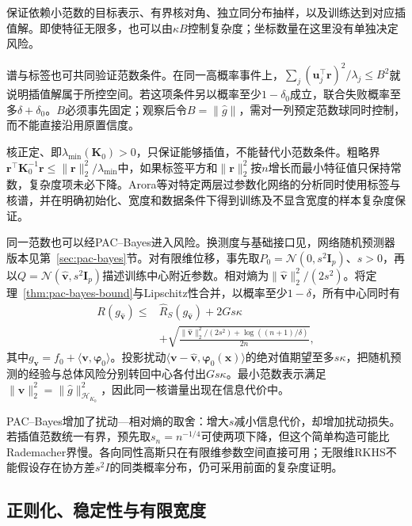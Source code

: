 保证依赖小范数的目标表示、有界核对角、独立同分布抽样，以及训练达到对应插值解。即使特征无限多，也可以由$\kappa B$控制复杂度；坐标数量在这里没有单独决定风险。

谱与标签也可共同验证范数条件。在同一高概率事件上，$\sum_j(\bm u_j^\top\bm r)^2/\lambda_j\leq B^2$就说明插值解属于所控空间。若这项条件另以概率至少$1-\delta_0$成立，联合失败概率至多$\delta+\delta_0$。$B$必须事先固定；观察后令$B=\|\widehat g\|$，需对一列预定范数球同时控制，而不能直接沿用原置信度。

核正定、即$\lambda_{\min}(\bm K_0)>0$，只保证能够插值，不能替代小范数条件。粗略界$\bm r^\top\bm K_0^{-1}\bm r\leq\|\bm r\|_2^2/\lambda_{\min}$中，如果标签平方和$\|\bm r\|_2^2$按$n$增长而最小特征值只保持常数，复杂度项未必下降。Arora等对特定两层过参数化网络的分析同时使用标签与核谱，并在明确初始化、宽度和数据条件下得到训练及不显含宽度的样本复杂度保证。

同一范数也可以经PAC--Bayes进入风险。换测度与基础接口见，网络随机预测器版本见第~\ref{sec:pac-bayes}节。对有限维位移，事先取$P_0=\mathcal N(0,s^2\bm I_p)$、$s>0$，再以$Q=\mathcal N(\widehat{\bm v},s^2\bm I_p)$描述训练中心附近参数。相对熵为$\|\widehat{\bm v}\|_2^2/(2s^2)$。将定理~\ref{thm:pac-bayes-bound}与Lipschitz性合并，以概率至少$1-\delta$，所有中心同时有
\begin{equation}
 \begin{aligned}
 R(g_{\widehat{\bm v}})\leq{}&\hat R_S(g_{\widehat{\bm v}})+2Gs\kappa\\
 &+\sqrt{\frac{\|\widehat{\bm v}\|_2^2/(2s^2)+\log((n+1)/\delta)}{2n}},
 \end{aligned}
 \label{eq:ntk-pac-bayes-risk}
\end{equation}
其中$g_{\bm v}=f_0+\langle\bm v,\bm\varphi_0\rangle$。投影扰动$\langle\bm v-\widehat{\bm v},\bm\varphi_0(\bm x)\rangle$的绝对值期望至多$s\kappa$，把随机预测的经验与总体风险分别转回中心各付出$Gs\kappa$。最小范数表示满足$\|\widehat{\bm v}\|_2^2=\|\widehat g\|_{\mathcal H_{K_0}}^2$，因此同一核谱量出现在信息代价中。

PAC--Bayes增加了扰动—相对熵的取舍：增大$s$减小信息代价，却增加扰动损失。若插值范数统一有界，预先取$s_n=n^{-1/4}$可使两项下降，但这个简单构造可能比Rademacher界慢。各向同性高斯只在有限维参数空间直接可用；无限维RKHS不能假设存在协方差$s^2I$的同类概率分布，仍可采用前面的复杂度证明。

\subsection{正则化、稳定性与有限宽度}

